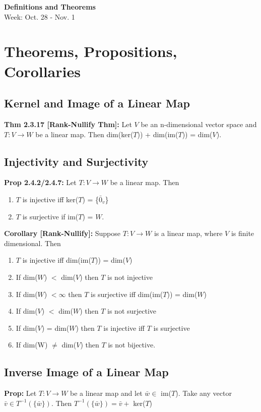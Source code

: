 \noindent
\textbf{\LARGE Definitions and Theorems} \\
\large Week: Oct. 28 - Nov. 1

\normalsize


\section*{Theorems, Propositions, Corollaries}
\subsection*{Kernel and Image of a Linear Map}

\textbf{Thm 2.3.17 [Rank-Nullify Thm]:} Let $V$ be an n-dimensional vector space and $T: V \rightarrow W$ be a linear map. Then dim(ker($T$)) + dim(im($T$)) = dim($V$).

\subsection*{Injectivity and Surjectivity}

\textbf{Prop 2.4.2/2.4.7:} Let $T: V \rightarrow W$ be a linear map. Then
\begin{enumerate}
    \item $T$ is injective iff ker($T$) = \{$\bar 0_v$\}
    \item $T$ is surjective if im($T$) = $W$.
\end{enumerate}


\noindent
\textbf{Corollary [Rank-Nullify]:} Suppose $T: V \rightarrow W$ is a linear map, where $V$ is finite dimensional. Then
\begin{enumerate}
    \item $T$ is injective iff dim(im($T$)) = dim($V$) 
    \item If dim($W$) $<$ dim($V$) then $T$ is not injective
    \item If dim($W$) $< \infty$ then $T$ is surjective iff dim(im($T$)) = dim($W$)
    \item If dim($V$) $<$ dim($W$) then $T$ is not surjective
    \item If dim($V$) = dim($W$) then $T$ is injective iff $T$ is surjective
    \item If dim(W) $\ne$ dim($V$) then $T$ is not bijective.   
\end{enumerate}

\subsection*{Inverse Image of a Linear Map}
\textbf{Prop:} Let $T: V \rightarrow W$ be a linear map and let $\bar w \in $ im($T$). Take any vector $\bar v \in T^{-1}(\{\bar w\})$. Then $T^{-1}(\{\bar w\}) = \bar v + $ ker($T$)

